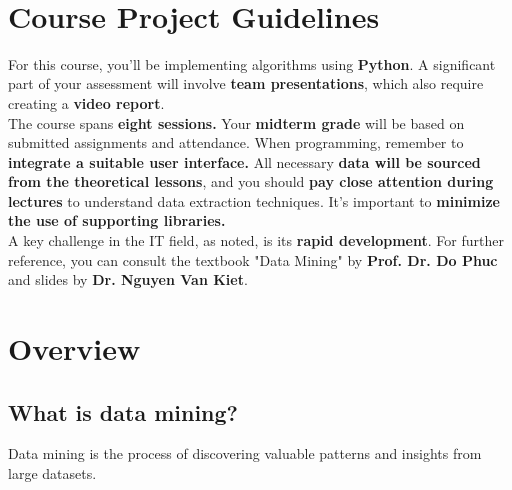 

\newcommand{\tab}{\hspace{\parindent}}

\begin{titlepage}
\bordertitle
\begin{center}
\vspace{\fill} \maintitle \\ \vspace{\fill} \bottitle
\end{center}
\end{titlepage}
\newpage
{}
\tableofcontents
\thispagestyle{empty}
\newpage
\chapter*{ Course Project Guidelines }
\thispagestyle{empty}
\vspace{\fill}
For this course, you'll be implementing algorithms using \textbf{Python}. A significant part of your assessment will involve \textbf{team presentations}, which also require creating a \textbf{video report}.\\
The course spans \textbf{eight sessions.} Your \textbf{midterm grade} will be based on submitted assignments and attendance. When programming, remember to \textbf{integrate a suitable user interface.} All necessary \textbf{data will be sourced from the theoretical lessons}, and you should \textbf{pay close attention during lectures} to understand data extraction techniques. It's important to \textbf{minimize the use of supporting libraries.}\\
A key challenge in the IT field, as noted, is its \textbf{rapid development}. For further reference, you can consult the textbook "Data Mining" by \textbf{Prof. Dr. Do Phuc} and slides by \textbf{Dr. Nguyen Van Kiet}.
\vspace{\fill}
\newpage
\setcounter{page}{1}
\chapter{ Overview }
\section{What is data mining?}
Data mining is the process of discovering valuable patterns and insights from large datasets.
